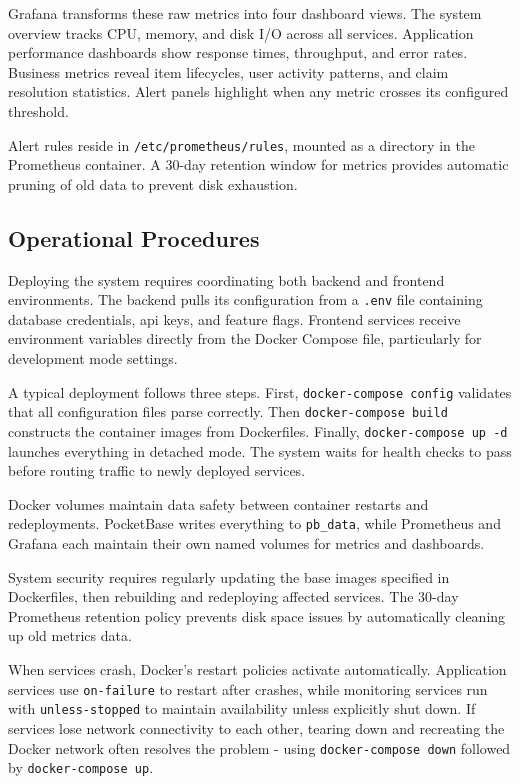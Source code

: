 Grafana transforms these raw metrics into four dashboard views. The system overview tracks CPU, memory, and disk I/O across all services. Application performance dashboards show response times, throughput, and error rates. Business metrics reveal item lifecycles, user activity patterns, and claim resolution statistics. Alert panels highlight when any metric crosses its configured threshold.

Alert rules reside in \texttt{/etc/prometheus/rules}, mounted as a directory in the Prometheus container. A 30-day retention window for metrics provides automatic pruning of old data to prevent disk exhaustion.

\subsection{Operational Procedures} \label{subsection:operational_procedures}

Deploying the system requires coordinating both backend and frontend environments. The backend pulls its configuration from a \texttt{.env} file containing database credentials, \ac{api} keys, and feature flags. Frontend services receive environment variables directly from the Docker Compose file, particularly for development mode settings.

A typical deployment follows three steps. First, \texttt{docker-compose config} validates that all configuration files parse correctly. Then \texttt{docker-compose build} constructs the container images from Dockerfiles. Finally, \texttt{docker-compose up -d} launches everything in detached mode. The system waits for health checks to pass before routing traffic to newly deployed services.

Docker volumes maintain data safety between container restarts and redeployments. PocketBase writes everything to \texttt{pb\_data}, while Prometheus and Grafana each maintain their own named volumes for metrics and dashboards.

System security requires regularly updating the base images specified in Dockerfiles, then rebuilding and redeploying affected services. The 30-day Prometheus retention policy prevents disk space issues by automatically cleaning up old metrics data.

When services crash, Docker's restart policies activate automatically. Application services use \texttt{on-failure} to restart after crashes, while monitoring services run with \texttt{unless-stopped} to maintain availability unless explicitly shut down. If services lose network connectivity to each other, tearing down and recreating the Docker network often resolves the problem - using \texttt{docker-compose down} followed by \texttt{docker-compose up}.

